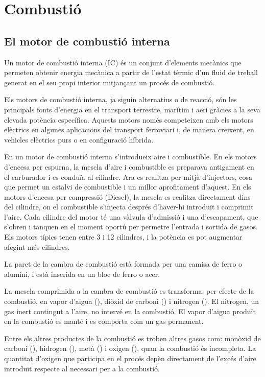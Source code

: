 \chapter{Combustió}

\section{El motor de combustió interna}

Un motor de combustió interna (IC) és un conjunt d'elements mecànics que permeten obtenir energia mecànica a partir de l'estat tèrmic d'un fluid de treball generat en el seu propi interior mitjançant un procés de combustió.

Els motors de combustió interna, ja siguin alternatius o de reacció, són les principals fonts d'energia en el transport terrestre, marítim i aeri gràcies a la seva elevada potència específica. Aquests motors només competeixen amb els motors elèctrics en algunes aplicacions del transport ferroviari i, de manera creixent, en vehicles elèctrics purs o en configuració híbrida\cite{de_antonio_motores_2015}.

En un motor de combusti\'o interna s'introdueix aire i combustible. En els motors d'encesa per espurna, la mescla d'aire i combustible es preparava antigament en el carburador i es condu\"ia al cilindre. Ara es realitza per mitj\`a d'injectors, cosa que permet un estalvi de combustible i un millor aprofitament d'aquest. En els motors d'encesa per compressi\'o (Diesel), la mescla es realitza directament dins del cilindre, on el combustible s'injecta despr\'es d'haver-hi introdu\"it i comprimit l'aire. Cada cilindre del motor t\'e una v\`alvula d'admissi\'o i una d'escapament, que s'obren i tanquen en el moment oport\'u per permetre l'entrada i sortida de gasos. Els motors típics tenen entre 3 i 12 cilindres, i la pot\`encia es pot augmentar afegint m\'es cilindres.

La paret de la cambra de combustió està formada per una camisa de ferro o alumini, i està inserida en un bloc de ferro o acer.

La mescla comprimida a la cambra de combusti\'o es transforma, per efecte de la combusti\'o, en vapor d'aigua (), di\`oxid de carboni () i nitrogen (). El nitrogen, un gas inert contingut a l'aire, no interv\'e en la combusti\'o. El vapor d'aigua produ\"it en la combusti\'o es mant\'e i es comporta com un gas permanent.

Entre els altres productes de la combusti\'o es troben altres gasos com: mon\`oxid de carboni (), hidrogen (), metà () i oxigen (), quan la combusti\'o \`es incompleta. La quantitat d'oxigen que participa en el proc\'es dep\`en directament de l'exc\'es d'aire introdu\"it respecte al necessari per a la combusti\'o.

